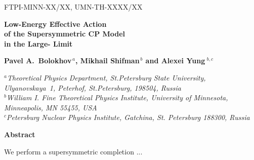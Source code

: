\documentclass[epsfig,12pt]{article}
\begin{document}
\begin{titlepage}


\begin{flushright}
FTPI-MINN-XX/XX, UMN-TH-XXXX/XX\\
\end{flushright}

\vspace{1.0cm}

\begin{center}
{  \Large \bf  Low-Energy Effective Action\\[1mm]
    of the Supersymmetric CP Model\\[3mm]
    in the Large- Limit}
\end{center}



\vspace{2mm}

\begin{center}

 {\large
 \bf   Pavel A.~Bolokhov$^{\,a}$,  Mikhail Shifman$^{\,b}$ and \bf Alexei Yung$^{\,\,b,c}$}
\end {center}

\begin{center}

$^a${\it Theoretical Physics Department, St.Petersburg State University, Ulyanovskaya~1, 
	 Peterhof, St.Petersburg, 198504, Russia}\\
$^b${\it  William I. Fine Theoretical Physics Institute,
University of Minnesota,
Minneapolis, MN 55455, USA}\\
$^{c}${\it Petersburg Nuclear Physics Institute, Gatchina, St. Petersburg
188300, Russia
}
\end{center}

\vspace{0.6cm}

\begin{center}
{\large\bf Abstract}
\end{center}

\hspace{0.3cm}
We perform a supersymmetric completion ...
\vspace{2cm}


\end{titlepage}
\end{document}
